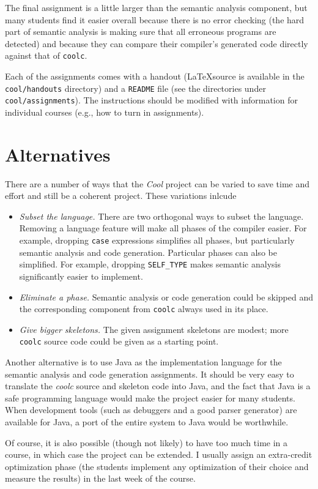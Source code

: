 The final assignment is a little larger than the semantic analysis component,
but many students find it easier overall because there is no error checking
(the hard part of semantic analysis is making sure that all erroneous
programs are detected) and because they can compare their compiler's
generated code directly against that of {\tt coolc}. 

Each of the assignments comes with a handout (\LaTeX source is available
in the {\tt cool/handouts} directory) and a {\tt README} file (see
the directories under {\tt cool/assignments}).  The instructions should
be modified with information for individual courses (e.g., how to turn
in assignments).

\section{Alternatives}

There are a number of ways that the {\em Cool} project can be varied
to save time and effort and still be a coherent project.  These
variations inlcude

\begin{itemize}

\item {\em Subset the language.} There are two orthogonal ways to subset
the language.  Removing a language feature will make all phases of the 
compiler easier.  For example, dropping {\tt case} expressions
simplifies all phases, but particularly semantic analysis and code generation.
Particular phases can also be simplified.  For example, dropping
{\tt SELF\_TYPE} makes semantic analysis significantly easier to implement.

\item {\em Eliminate a phase.} Semantic analysis or code generation could
be skipped and the corresponding component from {\tt coolc} always used in
its place.

\item {\em Give bigger skeletons.}  The given assignment skeletons are modest;
more {\tt coolc} source code could be given as a starting point.

\end{itemize}

Another alternative is to use Java as the implementation language for
the semantic analysis and code generation assignments.  It should be
very easy to translate the {\em coolc} source and skeleton code into
Java, and the fact that Java is a safe programming language would make
the project easier for many students.  When development tools (such as
debuggers and a good parser generator) are available for Java, a port
of the entire system to Java would be worthwhile.

Of course, it is also possible (though not likely) to have too much
time in a course, in which case the project can be extended.  I usually
assign an extra-credit optimization phase (the students implement any
optimization of their choice and measure the results) in the last week
of the course.





